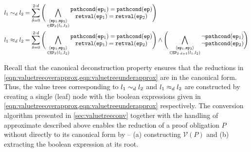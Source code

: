 \begin{footnotesize}
\begin{align}
l_1 \indEqDepth{d} l_2 &= \sum_{\delta=0}^{2 \cdot d} \Bigg( \bigwedge_{\substack{\langle \execpath{}_1, \execpath{}_2 \rangle \\ \in \execpaths{\delta}{l_1}{l_2}}} \begin{array}{@{}c@{}} \pathcond{\execpath{}_1} = \pathcond{\execpath{}} \\ \retval{\execpath{}_1} = \retval{\execpath{}_2} \end{array} \Bigg) \label{eqn:valuetreeoverapprox} \\
l_1 \indEqUapprox{d} l_2 &= \sum_{\delta=0}^{2 \cdot d} \Bigg( \bigwedge_{\substack{\langle \execpath{}_1, \execpath{}_2 \rangle \\ \in \execpaths{\delta}{l_1}{l_2}}} \begin{array}{@{}c@{}} \pathcond{\execpath{}_1} = \pathcond{\execpath{}} \\ \retval{\execpath{}_1} = \retval{\execpath{}_2} \end{array} \Bigg) \land \Bigg( \bigwedge_{\substack{\langle \execpath{}_1, \execpath{}_2 \rangle \\ \in \execpaths{2 \cdot d + 1}{l_1}{l_2}}} \begin{array}{@{}c@{}} \neg \pathcond{\execpath{}_1} \\ \neg \pathcond{\execpath{}_2} \end{array} \Bigg) \label{eqn:valuetreeunderapprox}
\end{align}
\end{footnotesize}

Recall that the canonical deconstruction property ensures that the reductions in \cref{eqn:valuetreeoverapprox,eqn:valuetreeunderapprox} are in the canonical form.
Thus, the value trees corresponding to $l_1 \sim_{d} l_2$ and $l_1 \approx_{d} l_2$ are constructed by creating a single (leaf) node
with the boolean expressions given in \cref{eqn:valuetreeoverapprox,eqn:valuetreeunderapprox} respectively.
The conversion algorithm presented in \cref{sec:valuetreeconv} together with the handling of approximate \recursiveRelations{} described above
enables the reduction of a proof obligation $P$ without \recursiveRelations{} directly to its canonical form by --
(a) constructing $\mathcal{V}(P)$ and (b) extracting the boolean expression at its root.

\vspace{-7px}
